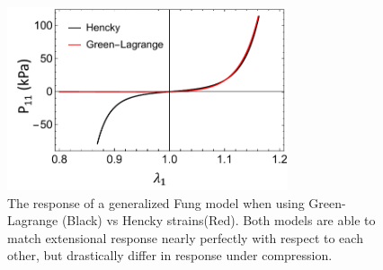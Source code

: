     
\begin{figure}
\centering
\includegraphics[width=3.25in]{Images/chapter5/gvsecompression}
\caption{The response of a generalized Fung model when using Green-Lagrange (Black) vs Hencky strains(Red). Both models are able to match extensional response nearly perfectly with respect to each other, but drastically differ in response under compression.}
\label{fig:gvsecompression}
\end{figure}


	





